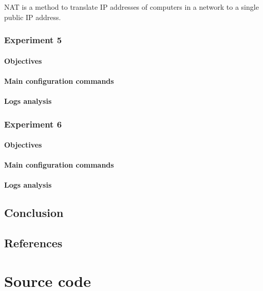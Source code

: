\documentclass[a4paper, 11pt]{report}
\begin{document}
NAT is a method to translate IP addresses of computers in a network to a single public IP address.

\subsection{Experiment 5} \label{sec:Exp5}
\subsubsection{Objectives} \label{sec:Obj5}
\subsubsection{Main configuration commands} \label{sec:Com5}
\subsubsection{Logs analysis} \label{sec:Log5}

\subsection{Experiment 6} \label{sec:Exp6}
\subsubsection{Objectives} \label{sec:Obj6}
\subsubsection{Main configuration commands} \label{sec:Com6}
\subsubsection{Logs analysis} \label{sec:Log6}

\section*{Conclusion} \label{sec:Conclusion}

\section*{References} \label{sec:References}

\appendix
\appendixpage
\addappheadtotoc
\chapter{Source code}
\end{document}
